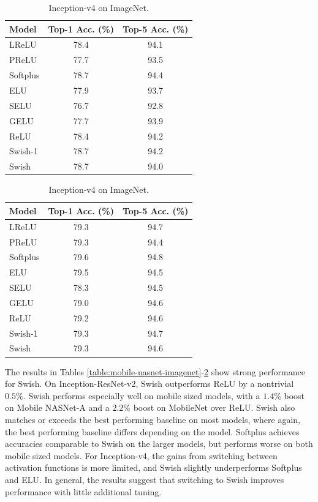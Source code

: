\documentclass{article} %
\begin{document}
\begin{table}[h!]
\centering
\small
\parbox{.45\linewidth}{
\begin{tabular}{lcc}
\toprule[0.25mm]
\bf{Model} & \bf{Top-1 Acc. (\%)} & \bf{Top-5 Acc. (\%)}  \\
\midrule
LReLU       & 78.4  & 94.1  \\
PReLU       & 77.7  & 93.5  \\
Softplus    & 78.7  & 94.4  \\
ELU         & 77.9  & 93.7  \\
SELU        & 76.7  & 92.8  \\
GELU        & 77.7  & 93.9  \\
\midrule
ReLU        & 78.4  & 94.2  \\
\midrule
Swish-1     & 78.7  & 94.2  \\
Swish       & 78.7  & 94.0  \\
\bottomrule[0.25mm]
\end{tabular}
\caption{Inception-v3 on ImageNet.}
\label{table:inet3-imagenet}
}
\hfill
\parbox{.45\linewidth}{
\begin{tabular}{lcc}
\toprule[0.25mm]
\bf{Model} & \bf{Top-1 Acc. (\%)} & \bf{Top-5 Acc. (\%)}  \\
\midrule
LReLU       & 79.3  & 94.7  \\
PReLU       & 79.3  & 94.4  \\
Softplus    & 79.6  & 94.8  \\
ELU         & 79.5  & 94.5  \\
SELU        & 78.3  & 94.5  \\
GELU        & 79.0  & 94.6  \\
\midrule
ReLU        & 79.2  & 94.6  \\
\midrule
Swish-1     & 79.3  & 94.7  \\
Swish       & 79.3  & 94.6  \\
\bottomrule[0.25mm]
\end{tabular}
\caption{Inception-v4 on ImageNet.}
\label{table:inet4-imagenet}
}
\end{table}

The results in Tables \ref{table:mobile-nasnet-imagenet}-\ref{table:inet4-imagenet} show strong performance for Swish. On Inception-ResNet-v2, Swish outperforms ReLU by a nontrivial $0.5\%$. Swish performs especially well on mobile sized models, with a $1.4\%$ boost on Mobile NASNet-A and a $2.2\%$ boost on MobileNet over ReLU. Swish also matches or exceeds the best performing baseline on most models, where again, the best performing baseline differs depending on the model. Softplus achieves accuracies comparable to Swish on the larger models, but performs worse on both mobile sized models. For Inception-v4, the gains from switching between activation functions is more limited, and Swish slightly underperforms Softplus and ELU. In general, the results suggest that switching to Swish improves performance with little additional tuning.
\end{document}
